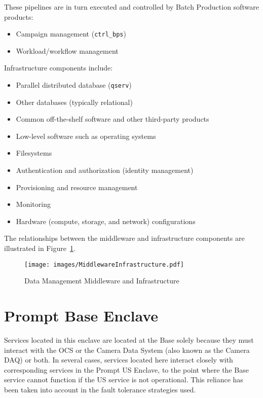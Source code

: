 \documentclass[DM,toc,lsstdraft]{lsstdoc}
\begin{document}
These pipelines are in turn executed and controlled by Batch Production software products:
\begin{itemize}
\item
  Campaign management (\texttt{ctrl\_bps})
\item
  Workload/workflow management
\end{itemize}

Infrastructure components include:
\begin{itemize}
\item
  Parallel distributed database (\texttt{qserv})
\item
  Other databases (typically relational)
\item
  Common off-the-shelf software and other third-party products
\item
  Low-level software such as operating systems
\item
  Filesystems
\item
  Authentication and authorization (identity management)
\item
  Provisioning and resource management
\item
  Monitoring
\item
  Hardware (compute, storage, and network) configurations
\end{itemize}

The relationships between the middleware and infrastructure components
are illustrated in Figure~\ref{fig:mwandinfra}.

\begin{figure}
\centering
\texttt{[image: images/MiddlewareInfrastructure.pdf]}
\caption{Data Management Middleware and Infrastructure}
\label{fig:mwandinfra}
\end{figure}


\section{Prompt Base Enclave}\label{prompt-base-enclave}

Services located in this enclave are located at the Base solely because
they must interact with the OCS or the Camera Data System (also known as
the Camera DAQ) or both. In several cases, services located here
interact closely with corresponding services in the Prompt US Enclave,
to the point where the Base service cannot function if the
US service is not operational. This reliance has been taken into
account in the fault tolerance strategies used.
\end{document}
